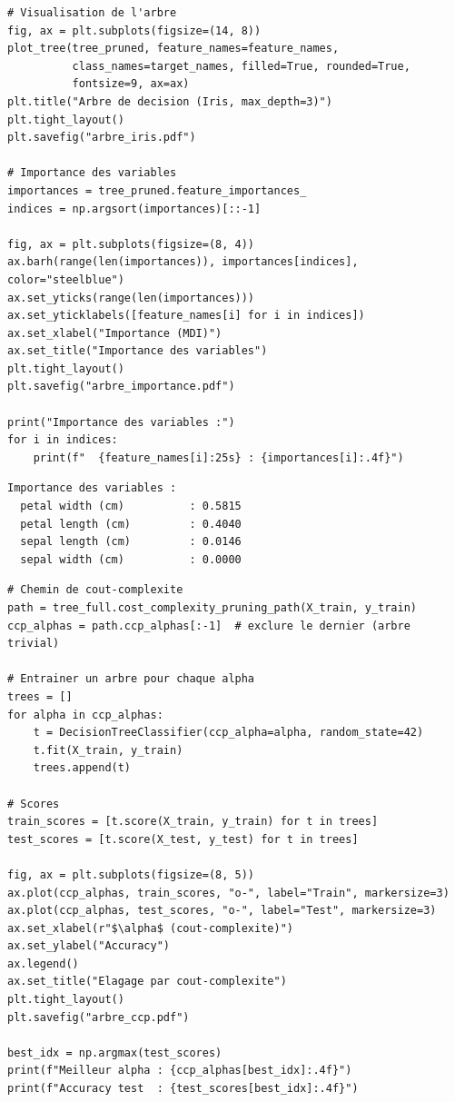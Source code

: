 \begin{codeblock}[title=\textbf{Visualisation de l'arbre et importance des variables}]
\begin{verbatim}
# Visualisation de l'arbre
fig, ax = plt.subplots(figsize=(14, 8))
plot_tree(tree_pruned, feature_names=feature_names,
          class_names=target_names, filled=True, rounded=True,
          fontsize=9, ax=ax)
plt.title("Arbre de decision (Iris, max_depth=3)")
plt.tight_layout()
plt.savefig("arbre_iris.pdf")

# Importance des variables
importances = tree_pruned.feature_importances_
indices = np.argsort(importances)[::-1]

fig, ax = plt.subplots(figsize=(8, 4))
ax.barh(range(len(importances)), importances[indices], color="steelblue")
ax.set_yticks(range(len(importances)))
ax.set_yticklabels([feature_names[i] for i in indices])
ax.set_xlabel("Importance (MDI)")
ax.set_title("Importance des variables")
plt.tight_layout()
plt.savefig("arbre_importance.pdf")

print("Importance des variables :")
for i in indices:
    print(f"  {feature_names[i]:25s} : {importances[i]:.4f}")
\end{verbatim}
\end{codeblock}

\begin{codeoutput}
\begin{verbatim}
Importance des variables :
  petal width (cm)          : 0.5815
  petal length (cm)         : 0.4040
  sepal length (cm)         : 0.0146
  sepal width (cm)          : 0.0000
\end{verbatim}
\end{codeoutput}

\begin{codeblock}[title=\textbf{Post-\'elagage par co\^ut-complexit\'e}]
\begin{verbatim}
# Chemin de cout-complexite
path = tree_full.cost_complexity_pruning_path(X_train, y_train)
ccp_alphas = path.ccp_alphas[:-1]  # exclure le dernier (arbre trivial)

# Entrainer un arbre pour chaque alpha
trees = []
for alpha in ccp_alphas:
    t = DecisionTreeClassifier(ccp_alpha=alpha, random_state=42)
    t.fit(X_train, y_train)
    trees.append(t)

# Scores
train_scores = [t.score(X_train, y_train) for t in trees]
test_scores = [t.score(X_test, y_test) for t in trees]

fig, ax = plt.subplots(figsize=(8, 5))
ax.plot(ccp_alphas, train_scores, "o-", label="Train", markersize=3)
ax.plot(ccp_alphas, test_scores, "o-", label="Test", markersize=3)
ax.set_xlabel(r"$\alpha$ (cout-complexite)")
ax.set_ylabel("Accuracy")
ax.legend()
ax.set_title("Elagage par cout-complexite")
plt.tight_layout()
plt.savefig("arbre_ccp.pdf")

best_idx = np.argmax(test_scores)
print(f"Meilleur alpha : {ccp_alphas[best_idx]:.4f}")
print(f"Accuracy test  : {test_scores[best_idx]:.4f}")
\end{verbatim}
\end{codeblock}


